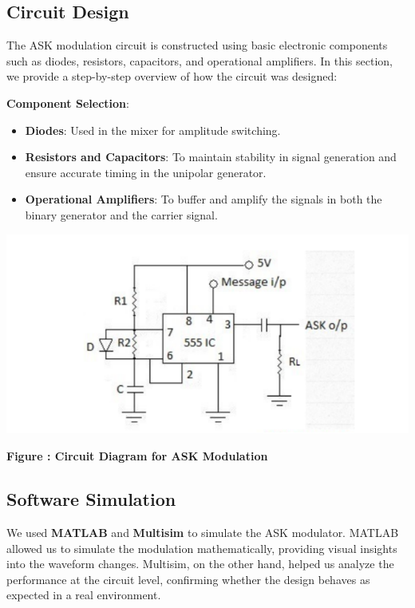 \documentclass[12pt,a4paper]{article}
\begin{document}
\subsection*{Circuit Design}
The ASK modulation circuit is constructed using basic electronic components such as diodes, resistors, capacitors, and operational amplifiers. In this section, we provide a step-by-step overview of how the circuit was designed:

\textbf{Component Selection}:
\begin{itemize}
    \item \textbf{Diodes}: Used in the mixer for amplitude switching.
    \item \textbf{Resistors and Capacitors}: To maintain stability in signal generation and ensure accurate timing in the unipolar generator.
    \item \textbf{Operational Amplifiers}: To buffer and amplify the signals in both the binary generator and the carrier signal.
\end{itemize}

\begin{center}
    {\includegraphics[width=550px, height=250px]{ckt.png}}
    \parbox{0.8\textwidth}{ 
        \centering
        \textbf{Figure : Circuit Diagram for ASK Modulation}
    }
\end{center}

\subsection*{Software Simulation}
We used \textbf{MATLAB} and \textbf{Multisim} to simulate the ASK modulator. MATLAB allowed us to simulate the modulation mathematically, providing visual insights into the waveform changes. Multisim, on the other hand, helped us analyze the performance at the circuit level, confirming whether the design behaves as expected in a real environment.
\end{document}

